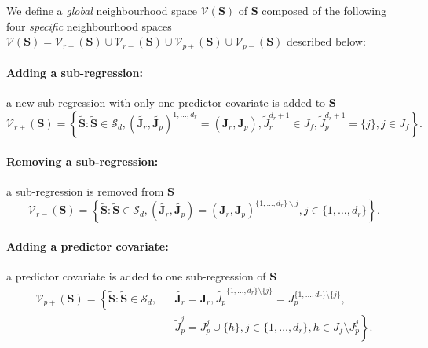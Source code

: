 \documentclass[12pt,a4paper]{report}
\begin{document}
We define a {\it global} neighbourhood space $\mathcal{V}(\boldsymbol{S})$ of $\boldsymbol{S}$ composed of the following four {\it specific} neighbourhood spaces $\mathcal{V}(\boldsymbol{S})=\mathcal{V}_{r+}(\boldsymbol{S})\cup\mathcal{V}_{r-}(\boldsymbol{S})\cup\mathcal{V}_{p+}(\boldsymbol{S})\cup\mathcal{V}_{p-}(\boldsymbol{S})$ described below:
	\paragraph{Adding a sub-regression:} a new sub-regression with only one predictor covariate is added to $\boldsymbol{S}$
\begin{equation}
\mathcal{V}_{r+}(\boldsymbol{S}) = \left\{\tilde{\boldsymbol{S}}: \tilde{\boldsymbol{S}}\in\mathcal{S}_d, (\tilde{\boldsymbol{J}_r},\tilde{\boldsymbol{J}_p})^{1,\ldots,d_r}=(\boldsymbol{J}_r,\boldsymbol{J}_p), \tilde{J}_r^{d_r+1}\in J_f, \tilde{J}_p^{d_r+1}=\{j\}, j\in J_f \right\}. \nonumber
\end{equation}	
		\paragraph{Removing a sub-regression:} a sub-regression  is removed from $\boldsymbol{S}$
\begin{equation}
\mathcal{V}_{r-}(\boldsymbol{S}) = \left\{\tilde{\boldsymbol{S}}: \tilde{\boldsymbol{S}}\in\mathcal{S}_d, (\tilde{\boldsymbol{J}_r},\tilde{\boldsymbol{J}_p})=(\boldsymbol{J}_r,\boldsymbol{J}_p)^{\{1,\ldots,d_r\}\backslash j}, j\in\{1,\ldots,d_r\} \right\}. \nonumber
\end{equation}	
	\paragraph{Adding a predictor covariate:} a predictor covariate is added to one sub-regression of $\boldsymbol{S}$
\begin{eqnarray}
\mathcal{V}_{p+}(\boldsymbol{S}) = \left\{\tilde{\boldsymbol{S}}:  \tilde{\boldsymbol{S}}\in\mathcal{S}_d,\right. && \tilde{\boldsymbol{J}_r}=\boldsymbol{J}_r, \tilde{J_p}^{\{1,\dots,d_r \}\setminus \{j\}}=J_p^{\{1,\dots,d_r \}\setminus \{j\}} , \nonumber \\
& & \left. \tilde{J}_p^{j}=J_p^{j} \cup \{h\}, j\in \{1,\ldots,d_r\}, h\in J_f \setminus J_p^j\right\}. \nonumber
\end{eqnarray}
\end{document}
